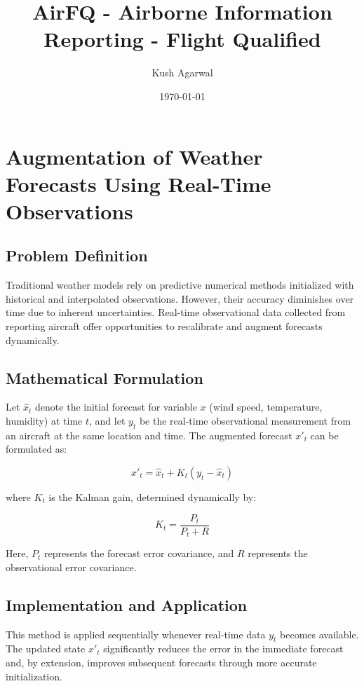 \documentclass[12pt,a4paper]{article}
\title{AirFQ - Airborne Information Reporting - Flight Qualified}
\author{Kush Agarwal}
\date{\today}
\begin{document}
\maketitle

\section{Augmentation of Weather Forecasts Using Real-Time Observations}

\subsection{Problem Definition}
Traditional weather models rely on predictive numerical methods initialized with historical and interpolated observations. However, their accuracy diminishes over time due to inherent uncertainties. Real-time observational data collected from reporting aircraft offer opportunities to recalibrate and augment forecasts dynamically.

\subsection{Mathematical Formulation}
Let $\hat{x}_t$ denote the initial forecast for variable $x$ (wind speed, temperature, humidity) at time $t$, and let $y_t$ be the real-time observational measurement from an aircraft at the same location and time. The augmented forecast $x'_t$ can be formulated as:

\begin{equation}
x'_t = \hat{x}_t + K_t(y_t - \hat{x}_t)
\end{equation}

where $K_t$ is the Kalman gain, determined dynamically by:

\begin{equation}
K_t = \frac{P_t}{P_t + R}
\end{equation}

Here, $P_t$ represents the forecast error covariance, and $R$ represents the observational error covariance.

\subsection{Implementation and Application}
This method is applied sequentially whenever real-time data $y_t$ becomes available. The updated state $x'_t$ significantly reduces the error in the immediate forecast and, by extension, improves subsequent forecasts through more accurate initialization.
\end{document}
